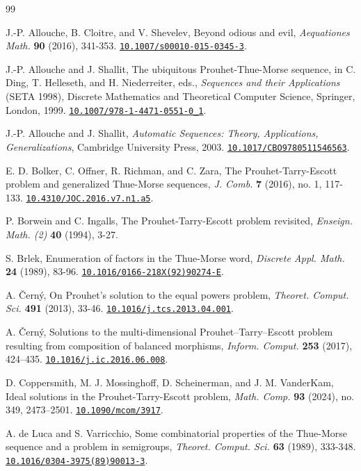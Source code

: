 \documentclass[12pt,reqno]{article}
\newcommand{\doi}[1]{\href{https://doi.org/#1}{\nolinkurl{#1}}}
\theoremstyle{plain}
\theoremstyle{definition}
\begin{document}
\begin{thebibliography}{99}

J.-P. Allouche, B. Cloitre, and V. Shevelev,
Beyond odious and evil,
\textit{Aequationes Math.} \textbf{90} (2016), 341-353.
\doi{10.1007/s00010-015-0345-3}.

J.-P. Allouche and J. Shallit,
The ubiquitous Prouhet-Thue-Morse sequence,
in C. Ding, T. Helleseth, and H. Niederreiter, eds.,
\textit{Sequences and their Applications} (SETA 1998),
Discrete Mathematics and Theoretical Computer Science,
Springer, London, 1999.
\doi{10.1007/978-1-4471-0551-0_1}.

J.-P. Allouche and J. Shallit,
\textit{Automatic Sequences: Theory, Applications, Generalizations},
Cambridge University Press, 2003.
\doi{10.1017/CBO9780511546563}.

E. D. Bolker, C. Offner, R. Richman, and C. Zara,
The Prouhet-Tarry-Escott problem and generalized Thue-Morse sequences,
\textit{J. Comb.} \textbf{7} (2016), no. 1, 117-133.
\doi{10.4310/JOC.2016.v7.n1.a5}.

P. Borwein and C. Ingalls,
The Prouhet-Tarry-Escott problem revisited,
\textit{Enseign. Math. (2)} \textbf{40} (1994), 3-27.

S. Brlek,
Enumeration of factors in the Thue-Morse word,
\textit{Discrete Appl. Math.} \textbf{24} (1989), 83-96.
\doi{10.1016/0166-218X(92)90274-E}.

A. \v{C}ern\'y,
On Prouhet's solution to the equal powers problem,
\textit{Theoret. Comput. Sci.} \textbf{491} (2013), 33-46.
\doi{10.1016/j.tcs.2013.04.001}.

A. \v{C}ern\'y,
Solutions to the multi-dimensional Prouhet--Tarry--Escott problem resulting from composition of balanced morphisms,
\textit{Inform. Comput.} \textbf{253} (2017), 424--435.
\doi{10.1016/j.ic.2016.06.008}.

D. Coppersmith, M. J. Mossinghoff, D. Scheinerman, and J. M. VanderKam,
Ideal solutions in the Prouhet-Tarry-Escott problem,
\textit{Math. Comp.} \textbf{93} (2024), no. 349, 2473--2501.
\doi{10.1090/mcom/3917}.

A. de Luca and S. Varricchio,
Some combinatorial properties of the Thue-Morse sequence and a problem in semigroups,
\textit{Theoret. Comput. Sci.} \textbf{63} (1989), 333-348.
\doi{10.1016/0304-3975(89)90013-3}.


\end{thebibliography}
\end{document}

